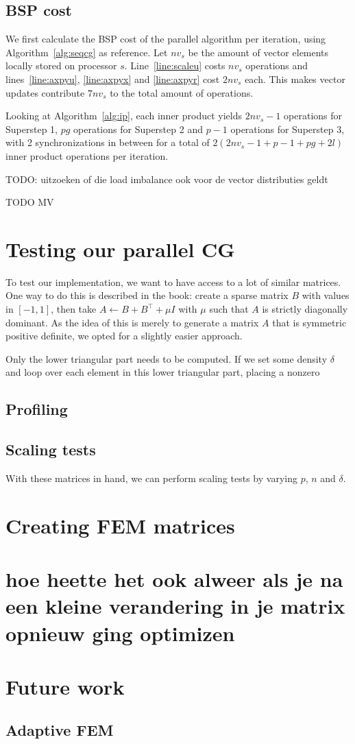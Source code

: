 \documentclass[11pt]{amsart}
\theoremstyle{definition}
\begin{document}
\subsection{BSP cost}
We first calculate the BSP cost of the parallel algorithm per iteration, using Algorithm~\ref{alg:seqcg} as reference. Let $nv_s$ be the amount of vector elements locally stored on processor $s$. Line~\ref{line:scaleu} costs $nv_s$ operations and lines~\ref{line:axpyu}, \ref{line:axpyx} and \ref{line:axpyr} cost $2nv_s$ each. This makes vector updates contribute $7nv_s$ to the total amount of operations. 

Looking at Algorithm~\ref{alg:ip}, each inner product yields $2nv_s - 1$ operations for Superstep 1, $pg$ operations for Superstep 2 and $p-1$ operations for Superstep 3, with 2 synchronizations in between for a total of $2(2nv_s - 1 + p-1 + pg + 2l)$ inner product operations per iteration.

TODO: uitzoeken of die load imbalance ook voor de vector distributies geldt

TODO MV

\section{Testing our parallel CG}
To test our implementation, we want to have access to a lot of similar matrices. One way to do this is described in the book: create a sparse matrix $B$ with values in $[-1,1]$, then take $A \gets B + B^\top + \mu I$ with $\mu$ such that $A$ is strictly diagonally dominant. As the idea of this is merely to generate a matrix $A$ that is symmetric positive definite, we opted for a slightly easier approach. 

Only the lower triangular part needs to be computed. If we set some density $\delta$ and loop over each element in this lower triangular part, placing a nonzero 

\subsection{Profiling}
\subsection{Scaling tests}
With these matrices in hand, we can perform scaling tests by varying $p$, $n$ and $\delta$.

\section{Creating FEM matrices}
\section{hoe heette het ook alweer als je na een kleine verandering in je matrix opnieuw ging optimizen}

\section{Future work}
\subsection{Adaptive FEM}




\end{document}

